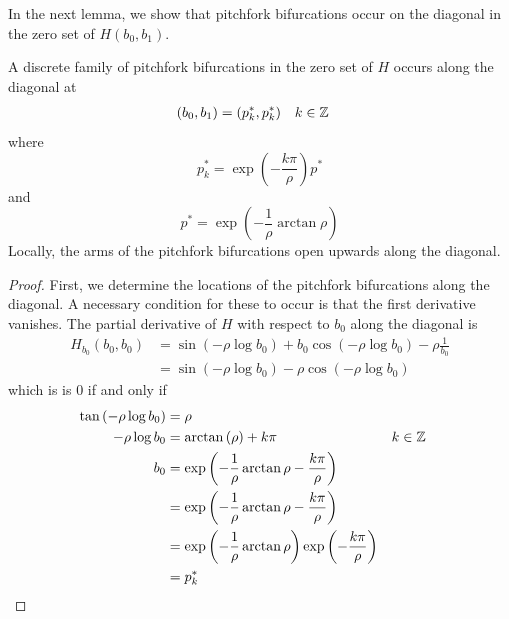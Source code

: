 \documentclass[thesis.tex]{subfiles}
\begin{document}
In the next lemma, we show that pitchfork bifurcations occur on the diagonal in the zero set of $H(b_0, b_1)$.

\begin{lemma}\label{pitchforkH}
A discrete family of pitchfork bifurcations in the zero set of $H$ occurs along the diagonal at 
\begin{align*}
(b_0, b_1) &= (p_k^*, p_k^*) && k \in {\mathbb Z}
\end{align*}
where 
\begin{equation}\label{pkstar}
p^*_k = \exp\left(-\frac{k \pi}{\rho} \right) p^*
\end{equation}
and 
\begin{equation}\label{pstar}
p^* = \exp \left( -\frac{1}{\rho} \arctan \rho \right)
\end{equation}
Locally, the arms of the pitchfork bifurcations open upwards along the diagonal.
\begin{proof}
First, we determine the locations of the pitchfork bifurcations along the diagonal. A necessary condition for these to occur is that the first derivative vanishes. The partial derivative of $H$ with respect to $b_0$ along the diagonal is
\begin{align*}
H_{b_0}(b_0, b_0) &= 
\sin \left( -\rho \log b_0 \right)
+ b_0 \cos \left( - \rho \log b_0 \right)- \rho \frac{1}{b_0} \\
&= \sin \left( - \rho \log b_0 \right) - \rho \cos \left( - \rho \log b_0 \right)
\end{align*}
which is is 0 if and only if
\begin{align*}
\tan \left( -\rho \log b_0 \right) &=  \rho \\
-\rho \log b_0 &= \arctan \left( \rho\right) + k \pi && k \in {\mathbb Z} \\ 
b_0 &= \exp \left( -\frac{1}{\rho} \arctan \rho - \frac{k \pi}{\rho} \right) \\
&= \exp \left( -\frac{1}{\rho} \arctan \rho - \frac{k \pi}{\rho} \right)  \\
&= \exp \left( -\frac{1}{\rho} \arctan \rho \right) \exp \left( - \frac{k \pi}{\rho} \right) \\
&= p_k^*
\end{align*}


\end{proof}
\end{lemma}
\end{document}
